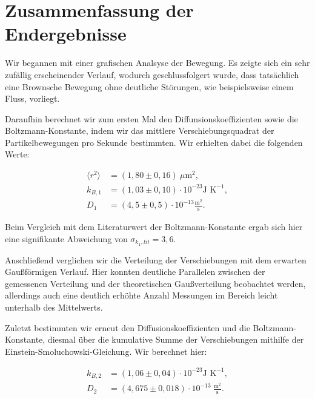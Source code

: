 \documentclass{article}
\begin{document}
\clearpage
\newpage
\section{Zusammenfassung der Endergebnisse}

Wir begannen mit einer grafischen Analsyse der Bewegung. Es zeigte sich ein sehr zufällig erscheinender Verlauf, wodurch geschlussfolgert wurde, dass tatsächlich eine Brownsche Bewegung ohne deutliche Störungen, wie beispielsweise einem Fluss, vorliegt.

Daraufhin berechnet wir zum ersten Mal den Diffunsionskoeffizienten sowie die Boltzmann-Konstante, indem wir das mittlere Verschiebungsquadrat der Partikelbewegungen pro Sekunde bestimmten. Wir erhielten dabei die folgenden Werte:

\begin{equation}
    \begin{split}
        \langle r^2 \rangle &= (1,80 \pm 0,16) \ \mu \text{m}^2, \\
        k_{B,1} &= (1,03 \pm 0,10) \cdot 10^{-23} \text{J K}^{-1}, \\
        D_1 &= (4,5 \pm 0,5) \cdot 10^{-13} \frac{\text{m}^2}{\text{s}}.
    \end{split}
\end{equation}

Beim Vergleich mit dem Literaturwert der Boltzmann-Konstante ergab sich hier eine signifikante Abweichung von $\sigma_{k_1,lit} = 3,6$.

Anschließend verglichen wir die Verteilung der Verschiebungen mit dem erwarten Gaußförmigen Verlauf. Hier konnten deutliche Parallelen zwischen der gemessenen Verteilung und der theoretischen Gaußverteilung beobachtet werden, allerdings auch eine deutlich erhöhte Anzahl Messungen im Bereich leicht unterhalb des Mittelwerts. 

Zuletzt bestimmten wir erneut den Diffusionskoeffizienten und die Boltzmann-Konstante, diesmal über die kumulative Summe der Verschiebungen mithilfe der Einstein-Smoluchowski-Gleichung. Wir berechnet hier:

\begin{equation}
    \begin{split}
        k_{B,2} &= (1,06 \pm 0,04) \cdot 10^{-23} \text{J K}^{-1}, \\
        D_2 &= (4,675 \pm 0,018) \cdot 10^{-13} \ \frac{\text{m}^2}{\text{s}}.
    \end{split}
\end{equation}
\end{document}
